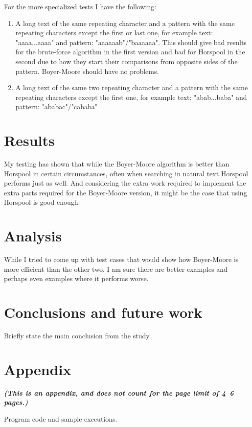 \documentclass[12pt,a4paper]{article}
\begin{document}
 For the more specialized tests I have the following:

\begin{enumerate}
\item A long text of the same repeating character and a pattern with the same repeating characters except the first or last one, for example text: "aaaa...aaaa" and pattern: "aaaaaab"/"baaaaaa". This should give bad results for the brute-force algorithm in the first version and bad for Horspool in the second due to how they start their comparisons from opposite sides of the pattern. Boyer-Moore should have no problems.
\item A long text of the same two repeating character and a pattern with the same repeating characters except the first one, for example text: "abab...baba" and pattern: "ababac"/"cababa"
\end{enumerate}

\section{Results}
\label{results}

My testing has shown that while the Boyer-Moore algorithm is better than Horspool in certain circumstances, often when searching in natural text Horspool performs just as well. And considering the extra work required to implement the extra parts required for the Boyer-Moore version, it might be the case that using Horspool is good enough.


\section{Analysis}
\label{analysis}


While I tried to come up with test cases that would show how Boyer-Moore is more efficient than the other two, I am sure there are better examples and perhaps even examples where it performs worse.

\section{Conclusions and future work}

Briefly state the main conclusion from the study.




\clearpage
\appendix
\section{Appendix}

\textbf{\emph{(This is an appendix, and does not count for the page limit of 4--6 pages.)}}

Program code and sample executions.
\end{document}

